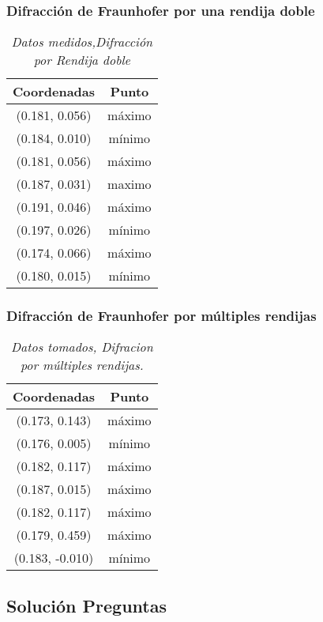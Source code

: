 \documentclass{article}									%
\begin{document}
\subsubsection{Difracción de Fraunhofer por una rendija doble}
\begin{table}[H]
\begin{center}
\begin{tabular}{ |c|c| } 
 \hline
Coordenadas & Punto \\ 
 \hline
(0.181, 0.056) & máximo\\ 
(0.184, 0.010) & mínimo\\
(0.181, 0.056) & máximo\\
(0.187, 0.031) & maximo\\
(0.191, 0.046) & máximo\\
(0.197, 0.026) & mínimo\\
(0.174, 0.066) & máximo\\
(0.180, 0.015) & mínimo\\
 \hline
\end{tabular}
\caption{ \emph{Datos medidos,Difracción por Rendija doble}}
\label{table:2}
\end{center}
\end{table}
\subsubsection{Difracción de Fraunhofer por múltiples rendijas}
\begin{table}[h!]
\begin{center}
\begin{tabular}{ |c|c| } 
 \hline
Coordenadas & Punto \\ 
 \hline
(0.173, 0.143) & máximo\\ 
(0.176, 0.005) & mínimo\\
(0.182, 0.117) & máximo\\ 
(0.187, 0.015) & máximo\\ 
(0.182, 0.117) & máximo\\
(0.179, 0.459) & máximo\\ 
(0.183, -0.010) & mínimo\\
 \hline
\end{tabular}
\caption{ \emph{Datos tomados, Difracion por múltiples rendijas. }}
\label{table:3}
\end{center}
\end{table}

\subsection{Solución Preguntas}
\end{document}
